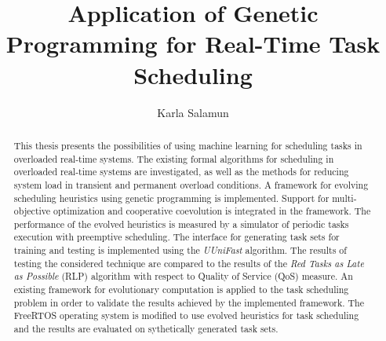 \documentclass[utf8, diplomski, english, numeric]{fer}
\begin{document}

\title{Application of Genetic Programming for Real-Time Task Scheduling}

\author{Karla Salamun}

\maketitle



\zahvala{}

\tableofcontents
\listoffigures











\begin{abstract}
This thesis presents the possibilities of using machine learning for scheduling tasks in overloaded real-time systems.
The existing formal algorithms for scheduling in overloaded real-time systems are investigated, as well as the methods for reducing system load in transient and permanent overload conditions.
A framework for evolving scheduling heuristics using genetic programming is implemented.
Support for multi-objective optimization and cooperative coevolution is integrated in the framework.
The performance of the evolved heuristics is measured by a simulator of periodic tasks execution with preemptive scheduling.
The interface for generating task sets for training and testing is implemented using the \textit{UUniFast} algorithm.
The results of testing the considered technique are compared to the results of the \textit{Red Tasks as Late as Possible} (RLP) algorithm with respect to Quality of Service (QoS) measure.
An existing framework for evolutionary computation is applied to the task scheduling problem in order to validate the results achieved by the implemented framework.
The FreeRTOS operating system is modified to use evolved heuristics for task scheduling and the results are evaluated on sythetically generated task sets.

\end{abstract}
\end{document}
